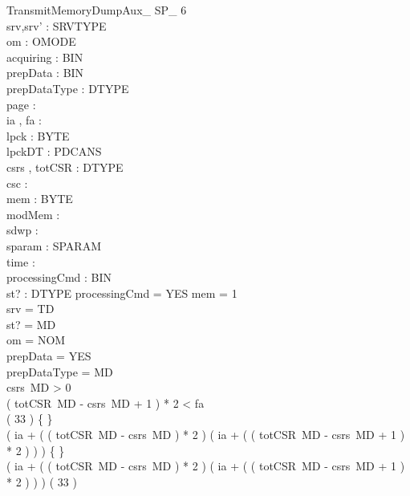 \begin{schema}{TransmitMemoryDumpAux\_ SP\_ 6}\\
 srv,srv' : SRVTYPE \\
 om : OMODE \\
 acquiring : BIN \\
 prepData : BIN \\
 prepDataType : DTYPE \\
 page : \nat \\
 ia , fa : \nat \\
 lpck : \seq BYTE \\
 lpckDT : PDCANS \\
 csrs , totCSR : DTYPE \fun \nat \\
 csc : \nat \\
 mem : \nat \pfun BYTE \\
 modMem : \power \nat \\
 sdwp : \nat \\
 sparam : SPARAM \fun \nat \\
 time : \nat \\
 processingCmd : BIN \\
 st? : DTYPE 
\where
 processingCmd = YES \land \dom mem = 1  \\
 srv = TD \\
 st? = MD \\
 om = NOM \\
 prepData = YES \\
 prepDataType = MD \\
 csrs~MD > 0 \\
 ( totCSR~MD - csrs~MD + 1 ) * 2 < fa \\
 ( 33  ) \neq \{ \} \\
 ( ia + ( ( totCSR~MD - csrs~MD ) * 2 ) \upto ( ia + ( ( totCSR~MD - csrs~MD + 1 ) * 2 ) ) ) \neq \{ \} \\
 ( ia + ( ( totCSR~MD - csrs~MD ) * 2 ) \upto ( ia + ( ( totCSR~MD - csrs~MD + 1 ) * 2 ) ) ) \subset ( 33  )
\end{schema}

